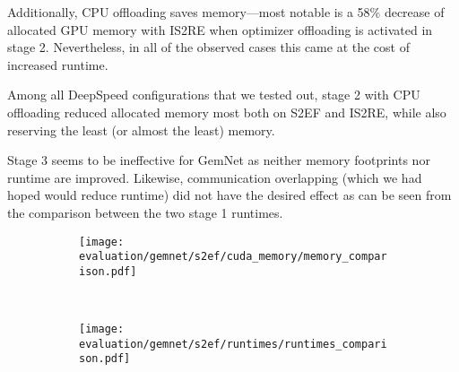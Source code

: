 Additionally, CPU offloading saves memory---most notable is a 58\% decrease of allocated GPU 
memory with IS2RE when optimizer offloading is activated in stage 2. 
Nevertheless, in all of the observed cases this came at the cost of increased runtime.

Among all DeepSpeed configurations that we tested out, stage 2 with CPU offloading 
reduced allocated memory most both on S2EF and IS2RE, while also reserving the least 
(or almost the least) memory.

Stage 3 seems to be ineffective for GemNet as neither memory footprints nor 
runtime are improved. Likewise, communication overlapping (which we had hoped would
reduce runtime) did not have the desired effect as can be seen from the comparison 
between the two stage 1 runtimes.

\begin{figure}[H]
    \centering

    \begin{subfigure}[t]{0.48\textwidth}
        \centering
        \texttt{[image: evaluation/gemnet/s2ef/cuda\_memory/memory\_comparison.pdf]}
    \end{subfigure}%
    ~
    \begin{subfigure}[t]{0.48\textwidth}
        \centering
        \texttt{[image: evaluation/gemnet/s2ef/runtimes/runtimes\_comparison.pdf]}
    \end{subfigure}


\end{figure}

